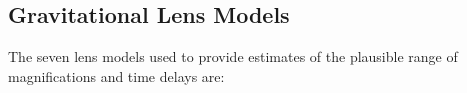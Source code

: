 \subsection{Gravitational Lens Models}\label{sec:LensingModels}



The seven lens models used to provide estimates of the plausible range
of magnifications and time delays are:

